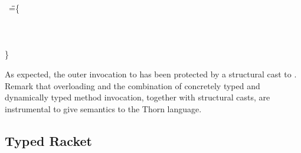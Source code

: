 \documentclass[acmlarge, anonymous, authordraft, review]{acmart} %
\newcommand{\FZ}[1]{\textbf{FZ: #1}}
\begin{document}
\begin{tabbing}
  \HS
  \KCall{\New \A{}}\n{\SubCast\C{(\KCall{\New\A{}}\m{\SubCast\any{\New\C{}}}\any\any)}}\C\C\
\HS\WHERE\HS=\HS\=
 \class\= \A \{\\
\>\>    \Mdef \m\x\any \any{~\x~}\\
\>\>    \Mdef \n\x\C\C{~\x~}\\
\>\>    \Mdef \n\x\any\any {\SubCast\any{\KCall\this\n{\SubCast\C\x}\C\C }} \\
\>\}
 \end{tabbing}
\medskip

\noindent As expected, the outer invocation to \n has been protected by a
structural cast to \C.  Remark that \kafka overloading and the combination
of concretely typed and dynamically typed method invocation, together with
structural casts, are instrumental to give semantics to the Thorn language.


 


\subsection{Typed Racket}
\end{document}

